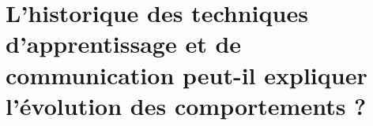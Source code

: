 
\chapter{L'historique des techniques d'apprentissage et de communication peut-il expliquer l'évolution des comportements ?}\label{historique}


